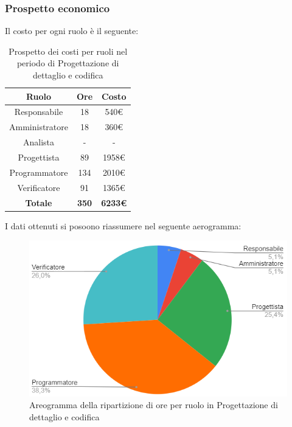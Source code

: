 \subsubsection{Prospetto economico}
Il costo per ogni ruolo è il seguente:
\begin{table}[H]
		\begin{center}
			\setlength{\aboverulesep}{0pt}
			\setlength{\belowrulesep}{0pt}
			\setlength{\extrarowheight}{.75ex}
			\begin{tabular}{ c c c }
				\rowcolor{AzzurroGruppo!30} 
				\textbf{Ruolo} & \textbf{Ore} & \textbf{Costo}  \\
				\toprule
				Responsabile   & 18 & 540€ \\
				Amministratore & 18 & 360€ \\
				Analista       & - & - \\
				Progettista    & 89 & 1958€ \\
				Programmatore  & 134 & 2010€ \\
				Verificatore   & 91 & 1365€ \\
				\textbf{Totale} & \textbf{350} & \textbf{6233€} \\
				\bottomrule
			\end{tabular}
			\caption{ Prospetto dei costi per ruoli nel periodo di Progettazione di dettaglio e codifica}
		\end{center}
	\end{table}
I dati ottenuti si posoono riassumere nel seguente aerogramma:
\begin{figure}[H]
    \centering
    \includegraphics[scale = 0.5]{components/img/dettaglio_torta.png}
    \caption{ Areogramma della ripartizione di ore per ruolo in Progettazione di dettaglio e codifica}
    \label{fig:logo}
\end{figure}
